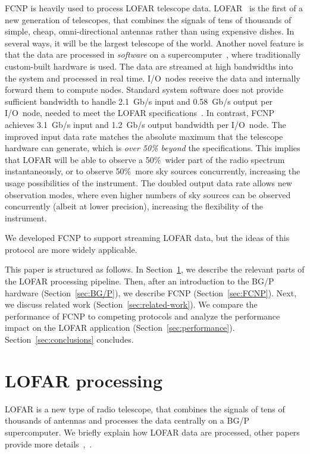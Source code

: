 \documentclass[conference]{worldcomp}
\begin{document}
FCNP is heavily used to process LOFAR telescope data.
LOFAR~\cite{Butcher:04,deVos:09} is the first of a new generation of
telescopes, that
combines the signals of tens of thousands of simple, cheap, omni-directional
antennas rather than using expensive dishes.
In several ways, it will be the largest telescope of the world.
Another novel feature is that the data are processed in \emph{software\/} on a
supercomputer~\cite{Romein:06,Romein:09b}, where traditionally custom-built hardware is
used.
The data are streamed at high bandwidths into the system and processed in real
time.
I/O~nodes receive the data and internally forward them to compute nodes.
Standard system software does not provide sufficient bandwidth to handle
2.1~Gb/s input and 0.58~Gb/s output per I/O~node, needed to meet the LOFAR
specifications~\cite{LOFAR_SPECS}.
In contrast, FCNP achieves 3.1~Gb/s input and 1.2~Gb/s output bandwidth per
I/O~node.
The improved input data rate matches the absolute maximum that the telescope
hardware can generate, which is \emph{over 50\% beyond\/} the specifications.
This implies that LOFAR will be able to observe a 50\%~wider part of the radio
spectrum instantaneously, or to observe 50\%~more sky sources concurrently,
increasing the usage possibilities of the instrument.
The doubled output data rate allows new observation modes, where even higher
numbers of sky sources can be observed concurrently (albeit at lower
precision), increasing the flexibility of the instrument.

We developed FCNP to support streaming LOFAR data,
but the ideas of this protocol are more widely applicable.

This paper is structured as follows.
In Section~\ref{sec:LOFAR}, we describe the relevant parts of the LOFAR
processing pipeline.
Then, after an introduction to the BG/P
hardware (Section~\ref{sec:BG/P}), we describe FCNP (Section~\ref{sec:FCNP}).
Next, we discuss related work (Section~\ref{sec:related-work}).
We compare the performance of FCNP to competing protocols and analyze the
performance impact on the LOFAR application (Section~\ref{sec:performance}).
Section~\ref{sec:conclusions} concludes.



\section{LOFAR processing}
\label{sec:LOFAR}

LOFAR is a new type of radio telescope, that combines the signals of tens of
thousands of antennas and processes the data centrally on a BG/P supercomputer.
We briefly explain how LOFAR data are processed, other papers provide more
details~\cite[Sec.~2]{Romein:06},~\cite[Sec.~4--6]{Romein:09b}.
\end{document}
